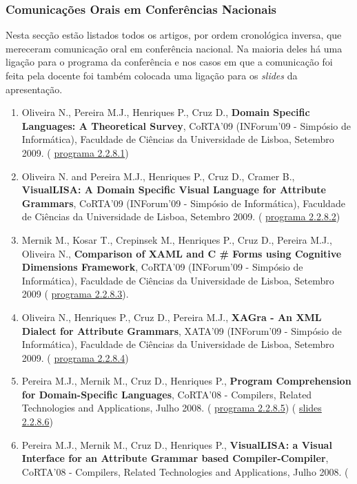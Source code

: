 \documentclass[11pt]{article}
\begin{document}
\subsubsection{Comunicações Orais em Conferências Nacionais}Nesta secção estão listados todos os artigos, por ordem cronológica inversa, que mereceram comunicação oral em conferência nacional.  Na maioria deles há uma ligação para o programa da conferência e nos casos em que a comunicação foi feita pela docente foi também colocada uma ligação para os {
\em{ slides}} da apresentação.
\begin{enumerate}
\item{Oliveira N., Pereira M.J., Henriques P., Cruz D., {
\bf{ Domain Specific Languages: A Theoretical Survey}}, CoRTA'09 (INForum'09 - Simpósio de Informática), Faculdade de Ciências da Universidade de Lisboa, Setembro 2009. (
\href{run:ComunicacoesOrais/programas/INForum2009.pdf}{programa 2.2.8.1})}
\item{Oliveira N. and Pereira M.J., Henriques P., Cruz D., Cramer B., {
\bf{ VisualLISA: A Domain Specific Visual Language for Attribute Grammars}}, CoRTA'09 (INForum'09 - Simpósio de Informática), Faculdade de Ciências da Universidade de Lisboa, Setembro 2009. (
\href{run:ComunicacoesOrais/programas/INForum2009.pdf}{programa 2.2.8.2})}
\item{Mernik M., Kosar T., Crepinsek M., Henriques P., Cruz D., Pereira M.J., Oliveira N., {
\bf{ Comparison of XAML and C
\# Forms using Cognitive Dimensions Framework}}, CoRTA'09 (INForum'09 - Simpósio de Informática), Faculdade de Ciências da Universidade de Lisboa, Setembro 2009 (
\href{run:ComunicacoesOrais/programas/INForum2009.pdf}{programa 2.2.8.3}).}
\item{Oliveira N., Henriques P., Cruz D., Pereira M.J., {
\bf{ XAGra - An XML Dialect for Attribute Grammars}}, XATA'09 (INForum'09 - Simpósio de Informática), Faculdade de Ciências da Universidade de Lisboa, Setembro 2009. (
\href{run:ComunicacoesOrais/programas/INForum2009.pdf}{programa 2.2.8.4}) }
\item{Pereira M.J., Mernik M., Cruz D., Henriques P., {
\bf{ Program Comprehension for Domain-Specific Languages}}, CoRTA'08 - Compilers, Related Technologies and Applications, Julho 2008. (
\href{run:ComunicacoesOrais/programas/CoRTA08prog.pdf}{programa 2.2.8.5}) (
\href{run:ComunicacoesOrais/Corta08DSLapres.pdf}{slides 2.2.8.6})}
\item{Pereira M.J., Mernik M., Cruz D., Henriques P., {
\bf{ VisualLISA: a Visual Interface for an Attribute Grammar based Compiler-Compiler}}, CoRTA'08 - Compilers, Related Technologies and Applications, Julho 2008. (
}
\end{enumerate}
\end{document}
